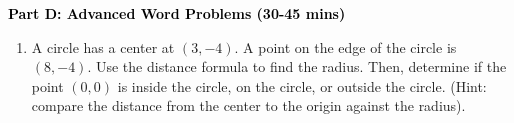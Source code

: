 \documentclass[12pt, letterpaper, fleqn]{article}
\begin{document}
\newpage

\begin{tcolorbox}[colback=customteal!20]
\large\textcolor{black}{\textbf{Part D: Advanced Word Problems (30-45 mins)}}
\end{tcolorbox}

\vspace{3mm}

\begin{enumerate}[itemsep=5.5cm, leftmargin=0.6cm, resume]
\item A circle has a center at $(3, -4)$. A point on the edge of the circle is $(8, -4)$. Use the distance formula to find the radius. Then, determine if the point $(0, 0)$ is inside the circle, on the circle, or outside the circle. (Hint: compare the distance from the center to the origin against the radius).
\end{enumerate}
\end{document}
